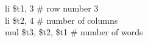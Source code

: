 \documentclass[../main.tex]{subfiles}
\begin{document}
{    \hspace*{4mm} \hspace*{0cm} \hspace*{0cm} \hspace*{0cm} \hspace*{0cm} li \$t1, 3 \hspace*{0cm} \hspace*{0cm} \hspace*{0cm} \hspace*{0cm} \hspace*{0cm} \hspace*{0cm} \hspace*{0cm} \hspace*{0cm} \hspace*{0cm} \hspace*{0cm} \# row number 3 \\
    \hspace*{4mm} \hspace*{0cm} \hspace*{0cm} \hspace*{0cm} \hspace*{0cm} li \$t2, 4 \hspace*{0cm} \hspace*{0cm} \hspace*{0cm} \hspace*{0cm} \hspace*{0cm} \hspace*{0cm} \hspace*{0cm} \hspace*{0cm} \hspace*{0cm} \hspace*{0cm} \# number of columns \\
    \hspace*{4mm} \hspace*{0cm} \hspace*{0cm} \hspace*{0cm} \hspace*{0cm} mul \$t3, \$t2, \$t1 \hspace*{0cm} \hspace*{0cm} \# number of words \\
}
\end{document}
